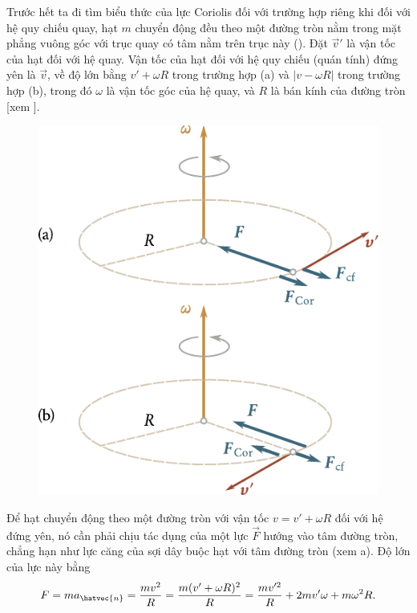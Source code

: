 Trước hết ta đi tìm biểu thức của lực Coriolis đối với trường hợp riêng khi đối với hệ quy chiếu quay, hạt $m$ chuyển động đều theo một đường tròn nằm trong mặt phẳng vuông góc với trục quay có tâm nằm trên trục này (). Đặt $\vec{v}'$ là vận tốc của hạt đối với hệ quay. Vận tốc của hạt đối với hệ quy chiếu (quán tính) đứng yên là $\vec{v}$, về độ lớn bằng $v'+\omega R$ trong trường hợp (a) và $|v-\omega R|$ trong trường hợp (b), trong đó $\omega$ là vận tốc góc của hệ quay, và $R$ là bán kính của đường tròn [xem ].

\begin{figure}[!htb]
	\begin{center}
		\includegraphics[scale=1]{figures/ch_04/fig_4_7.pdf}
		\caption[]{}
		\label{fig:4_7}
	\end{center}
\end{figure}

Để hạt chuyển động theo một đường tròn với vận tốc $v=v'+\omega R$ đối với hệ đứng yên, nó cần phải chịu tác dụng của một lực $\vec{F}$ hướng vào tâm đường tròn, chẳng hạn như lực căng của sợi dây buộc hạt với tâm đường tròn (xem a). Độ lớn của lực này bằng
\begin{equation}\label{eq:4_10}
F = m a_{\hatvec{n}} = \frac{mv^2}{R} = \frac{m(v'+\omega R)^2}{R} = \frac{mv'^2}{R} + 2mv'\omega + m\omega^2 R.
\end{equation}

